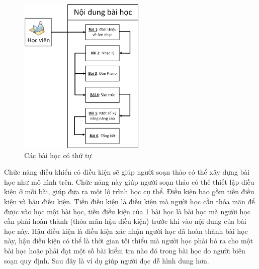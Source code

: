 	
		\begin{center}
		\begin{figure}[htp]
			\begin{center}
				\includegraphics[width=6cm]{Chapter1/Pictures/picture13.png}
			\end{center}
			\caption{Các bài học có thứ tự}
			\label{picture12}
		\end{figure}
	\end{center}
	\newpage
	
	Chức năng điều khiển có điều kiện sẽ giúp người soạn thảo có thể xây dựng bài học như mô hình trên. Chức năng này giúp người soạn thảo có thể thiết lập điều kiện ở mỗi bài, giúp đưa ra một lộ trình học cụ thể. Điều kiện bao gồm tiền điều kiện và hậu điều kiện. Tiền điều kiện là điều kiện mà người học cần thỏa mãn để được vào học một bài học, tiền điều kiện của 1 bài học là bài học mà người học cần phải hoàn thành (thỏa mãn hậu điều kiện) trước khi vào nội dung của bài học này. Hậu điều kiện là điều kiện xác nhận người học đã hoàn thành bài học này, hậu điều kiện có thể là thời gian tối thiểu mà người học phải bỏ ra cho một bài học hoặc phải đạt một số bài kiểm tra nào đó trong bài học do người biên soạn quy định. Sau đây là ví dụ giúp người đọc dễ hình dung hơn.
	
